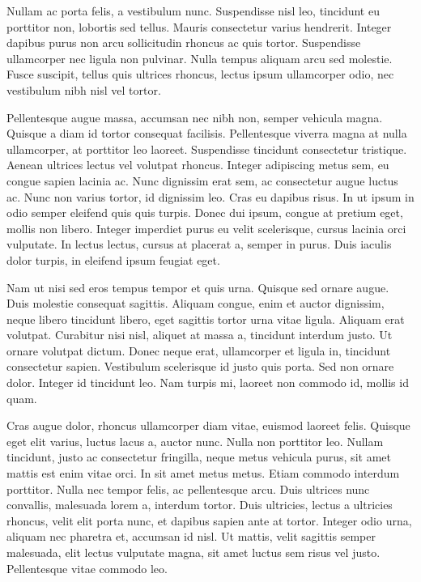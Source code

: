 \documentclass{scrartcl}
\begin{document}
Nullam ac porta felis, a vestibulum nunc. Suspendisse nisl leo, tincidunt eu porttitor non, lobortis sed tellus. Mauris consectetur varius hendrerit. Integer dapibus purus non arcu sollicitudin rhoncus ac quis tortor. Suspendisse ullamcorper nec ligula non pulvinar. Nulla tempus aliquam arcu sed molestie. Fusce suscipit, tellus quis ultrices rhoncus, lectus ipsum ullamcorper odio, nec vestibulum nibh nisl vel tortor.

Pellentesque augue massa, accumsan nec nibh non, semper vehicula magna. Quisque a diam id tortor consequat facilisis. Pellentesque viverra magna at nulla ullamcorper, at porttitor leo laoreet. Suspendisse tincidunt consectetur tristique. Aenean ultrices lectus vel volutpat rhoncus. Integer adipiscing metus sem, eu congue sapien lacinia ac. Nunc dignissim erat sem, ac consectetur augue luctus ac. Nunc non varius tortor, id dignissim leo. Cras eu dapibus risus. In ut ipsum in odio semper eleifend quis quis turpis. Donec dui ipsum, congue at pretium eget, mollis non libero. Integer imperdiet purus eu velit scelerisque, cursus lacinia orci vulputate. In lectus lectus, cursus at placerat a, semper in purus. Duis iaculis dolor turpis, in eleifend ipsum feugiat eget.

Nam ut nisi sed eros tempus tempor et quis urna. Quisque sed ornare augue. Duis molestie consequat sagittis. Aliquam congue, enim et auctor dignissim, neque libero tincidunt libero, eget sagittis tortor urna vitae ligula. Aliquam erat volutpat. Curabitur nisi nisl, aliquet at massa a, tincidunt interdum justo. Ut ornare volutpat dictum. Donec neque erat, ullamcorper et ligula in, tincidunt consectetur sapien. Vestibulum scelerisque id justo quis porta. Sed non ornare dolor. Integer id tincidunt leo. Nam turpis mi, laoreet non commodo id, mollis id quam.

Cras augue dolor, rhoncus ullamcorper diam vitae, euismod laoreet felis. Quisque eget elit varius, luctus lacus a, auctor nunc. Nulla non porttitor leo. Nullam tincidunt, justo ac consectetur fringilla, neque metus vehicula purus, sit amet mattis est enim vitae orci. In sit amet metus metus. Etiam commodo interdum porttitor. Nulla nec tempor felis, ac pellentesque arcu. Duis ultrices nunc convallis, malesuada lorem a, interdum tortor. Duis ultricies, lectus a ultricies rhoncus, velit elit porta nunc, et dapibus sapien ante at tortor. Integer odio urna, aliquam nec pharetra et, accumsan id nisl. Ut mattis, velit sagittis semper malesuada, elit lectus vulputate magna, sit amet luctus sem risus vel justo. Pellentesque vitae commodo leo.
\end{document}
